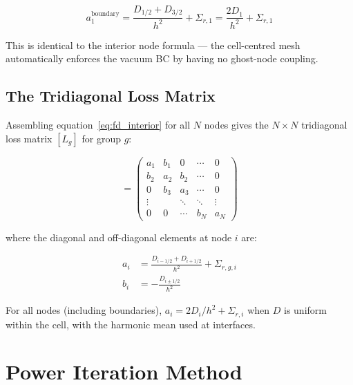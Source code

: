 \documentclass[12pt,a4paper]{article}
\begin{document}
\begin{eqbox}
\begin{equation}
  a_1^{\text{boundary}} = \frac{D_{1/2} + D_{3/2}}{h^2} + \Sigma_{r,1}
  = \frac{2D_1}{h^2} + \Sigma_{r,1}
  \label{eq:bc_diag}
\end{equation}
\end{eqbox}

This is identical to the interior node formula — the cell-centred mesh
automatically enforces the vacuum BC by having no ghost-node coupling.

\subsection{The Tridiagonal Loss Matrix}

Assembling equation~\eqref{eq:fd_interior} for all $N$ nodes gives
the $N \times N$ tridiagonal loss matrix $[L_g]$ for group $g$:

\begin{equation}
  [L_g] =
  \begin{pmatrix}
    a_1    & b_1    & 0      & \cdots & 0       \\
    b_2    & a_2    & b_2    & \cdots & 0       \\
    0      & b_3    & a_3    & \cdots & 0       \\
    \vdots &        & \ddots & \ddots & \vdots  \\
    0      & 0      & \cdots & b_N    & a_N
  \end{pmatrix}
\end{equation}

where the diagonal and off-diagonal elements at node $i$ are:

\begin{eqbox}
\begin{align}
  a_i &= \frac{D_{i-1/2} + D_{i+1/2}}{h^2} + \Sigma_{r,g,i}
  \label{eq:diag} \\[6pt]
  b_i &= -\frac{D_{i\pm 1/2}}{h^2}
  \label{eq:offdiag}
\end{align}
\end{eqbox}

For all nodes (including boundaries), $a_i = 2D_i/h^2 + \Sigma_{r,i}$
when $D$ is uniform within the cell, with the harmonic mean
used at interfaces.

\section{Power Iteration Method}
\end{document}
